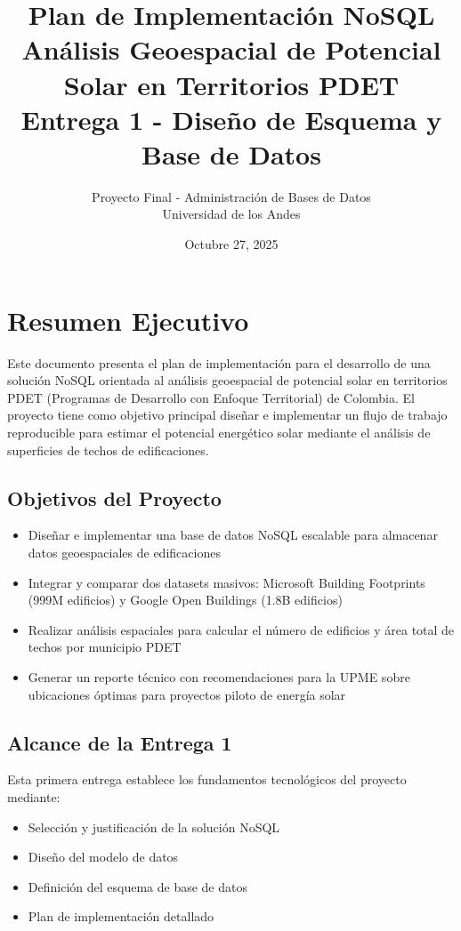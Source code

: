 \documentclass[12pt,a4paper]{article}
\title{\textbf{Plan de Implementación NoSQL}\\
\Large{Análisis Geoespacial de Potencial Solar en Territorios PDET}\\
\large{Entrega 1 - Diseño de Esquema y Base de Datos}}
\author{Proyecto Final - Administración de Bases de Datos\\
Universidad de los Andes}
\date{Octubre 27, 2025}
\begin{document}
\maketitle
\thispagestyle{empty}
\newpage

\tableofcontents
\newpage

\section{Resumen Ejecutivo}

Este documento presenta el plan de implementación para el desarrollo de una solución NoSQL orientada al análisis geoespacial de potencial solar en territorios PDET (Programas de Desarrollo con Enfoque Territorial) de Colombia. El proyecto tiene como objetivo principal diseñar e implementar un flujo de trabajo reproducible para estimar el potencial energético solar mediante el análisis de superficies de techos de edificaciones.

\subsection{Objetivos del Proyecto}
\begin{itemize}[leftmargin=*]
    \item Diseñar e implementar una base de datos NoSQL escalable para almacenar datos geoespaciales de edificaciones
    \item Integrar y comparar dos datasets masivos: Microsoft Building Footprints (999M edificios) y Google Open Buildings (1.8B edificios)
    \item Realizar análisis espaciales para calcular el número de edificios y área total de techos por municipio PDET
    \item Generar un reporte técnico con recomendaciones para la UPME sobre ubicaciones óptimas para proyectos piloto de energía solar
\end{itemize}

\subsection{Alcance de la Entrega 1}
Esta primera entrega establece los fundamentos tecnológicos del proyecto mediante:
\begin{itemize}[leftmargin=*]
    \item Selección y justificación de la solución NoSQL
    \item Diseño del modelo de datos
    \item Definición del esquema de base de datos
    \item Plan de implementación detallado
\end{itemize}
\end{document}
